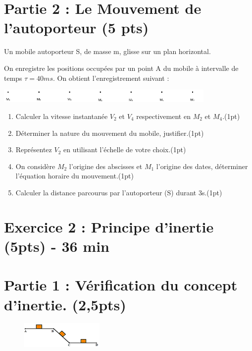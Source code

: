 \documentclass[12pt]{article}
\begin{document}
\section*{Partie 2 : Le Mouvement de l'autoporteur \dotfill(5 pts)}
Un mobile autoporteur S, de masse m, glisse sur un plan horizontal.

On enregistre les positions occupées par un point A du mobile à intervalle de temps $\tau = 40 ms$. On obtient l’enregistrement suivant : 
 \begin{center}
	\includegraphics[width=0.8\textwidth]{./img/ex2.png}
\end{center}

\begin{enumerate}

	\item Calculer la vitesse instantanée $V_2$ et $V_4$ respectivement en $M_2$ et $M_4$.\dotfill(1pt)
	\item Déterminer la nature du mouvement du mobile, justifier.\dotfill(1pt)
	\item Représentez $V_2$ en utilisant l'échelle de votre choix.\dotfill(1pt)
	\item On considère $M_2$ l’origine des abscisses et $M_1$ l’origine des dates, déterminer l’équation horaire du mouvement.\dotfill(1pt)
	\item Calculer la distance parcourus par l’autoporteur (S) durant 3s.\dotfill(1pt)
\end{enumerate}


\section*{Exercice 2 : Principe d’inertie \dotfill(5pts) - 36 min }
\section*{Partie 1 : Vérification du concept d'inertie. \dotfill(2,5pts)}

\begin{figure}
	\vspace{-0.8cm}
	\includegraphics[width=0.36\textwidth]{./img/last.png}
\end{figure}
\end{document}
